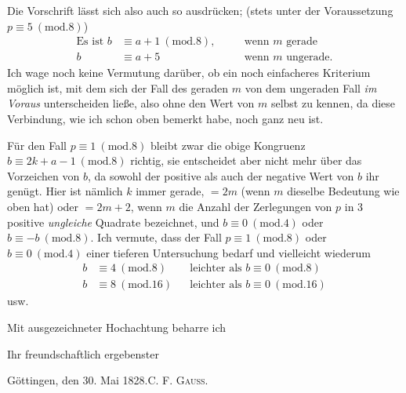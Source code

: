 \par{}Die Vorschrift lässt sich also auch so ausdrücken; (stets unter der Voraussetzung $p\equiv5\ (\mathrm{mod}.8)$)
\[
\begin{aligned}
\text{Es ist }b&\equiv a+1\ (\mathrm{mod}.8),&\quad&\text{wenn }m\text{ gerade}\\
b&\equiv a+5&&\text{wenn }m\text{ ungerade.}
\end{aligned}
\]
Ich wage noch keine Vermutung darüber, ob ein noch einfacheres Kriterium möglich ist, mit dem sich der Fall des geraden $m$ von dem ungeraden Fall \textit{im Voraus} unterscheiden ließe, also ohne den Wert von $m$ selbst zu kennen, da diese Verbindung, wie ich schon oben bemerkt habe, noch ganz neu ist.
\newpage
\par Für den Fall $p\equiv1\ (\mathrm{mod}.8)$ bleibt zwar die obige Kongruenz $b\equiv2k+a-1\ (\mathrm{mod}.8)$ richtig, sie entscheidet aber nicht mehr über das Vorzeichen von $b$, da sowohl der positive als auch der negative Wert von $b$ ihr genügt. Hier ist nämlich $k$ immer gerade, $=2m$ (wenn $m$ dieselbe Bedeutung wie oben hat) oder $=2m+2$, wenn $m$ die Anzahl der Zerlegungen von $p$ in 3 positive \textit{ungleiche} Quadrate bezeichnet, und $b\equiv0\ (\mathrm{mod}.4)$ oder $b\equiv-b\ (\mathrm{mod}.8)$. Ich vermute, dass der Fall $p\equiv1\ (\mathrm{mod}.8)$ oder $b\equiv0\ (\mathrm{mod}.4)$ einer tieferen Untersuchung bedarf und vielleicht wiederum
\[
\begin{aligned}
b&\equiv4\ (\mathrm{mod}.8)&&\text{leichter als }b\equiv0\ (\mathrm{mod}.8)\\
b&\equiv8\ (\mathrm{mod}.16)&&\text{leichter als }b\equiv0\ (\mathrm{mod}.16)
\end{aligned}
\]
usw.
\par{}Mit ausgezeichneter Hochachtung beharre ich
\par\nobreak\noindent\hfill Ihr freundschaftlich ergebenster
\par\nobreak\noindent Göttingen, den 30. Mai 1828.\hfill C. F. \textsc{Gauss}.

